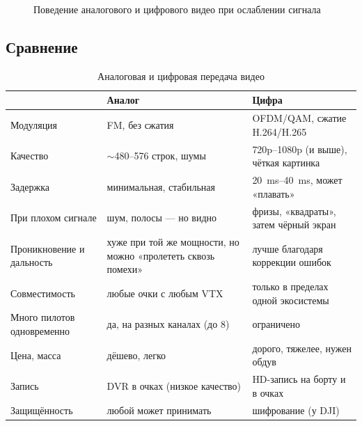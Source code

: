 \begin{figure}[H]\centering
{}
\caption{Поведение аналогового и цифрового видео при ослаблении сигнала}
\end{figure}

\subsection{Сравнение}
\begin{table}[H]\centering\small
\renewcommand{\arraystretch}{1.3}
\begin{tabularx}{\linewidth}{@{}p{32mm} X X@{}}
\toprule
 & \textbf{Аналог} & \textbf{Цифра} \\
\midrule
Модуляция & FM, без сжатия & OFDM/QAM, сжатие H.264/H.265 \\
Качество & $\sim$480–576 строк, шумы & 720p–1080p (и выше), чёткая картинка \\
Задержка & минимальная, стабильная & \SIrange{20}{40}{\milli\second}, может «плавать» \\
При плохом сигнале & шум, полосы — но видно & фризы, «квадраты», затем чёрный экран \\
Проникновение и дальность & хуже при той же мощности, но можно «пролететь сквозь помехи» & лучше благодаря коррекции ошибок \\
Совместимость & любые очки с любым VTX & только в пределах одной экосистемы \\
Много пилотов одновременно & да, на разных каналах (до 8) & ограничено \\
Цена, масса & дёшево, легко & дорого, тяжелее, нужен обдув \\
Запись & DVR в очках (низкое качество) & HD-запись на борту и в очках \\
Защищённость & любой может принимать & шифрование (у DJI) \\
\bottomrule
\end{tabularx}
\caption{Аналоговая и цифровая передача видео}
\end{table}

